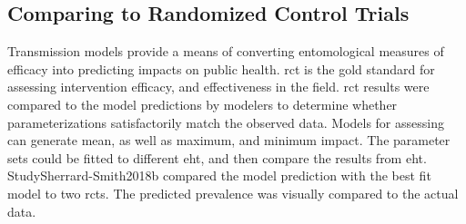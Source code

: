 \documentclass[a4paper, 12pt, twoside]{report}
\begin{document}
%
%
%
%

\subsection{Comparing to Randomized Control Trials}
Transmission models provide a means of converting entomological measures of efficacy into predicting impacts on public health.
\gls{rct} is the gold standard for assessing intervention efficacy, and effectiveness in the field.
\gls{rct} results were compared to the model predictions by modelers to determine whether parameterizations satisfactorily match the observed data\cite{Sherrard-Smith2018b}.
Models for assessing can generate mean, as well as maximum, and minimum impact.
The parameter sets could be fitted to different \gls{eht}, and then compare the results from \gls{eht}.
Study{Sherrard-Smith2018b} compared the model prediction with the best fit model to two \gls{rct}s.
The predicted prevalence was visually compared to the actual data.
\end{document}
